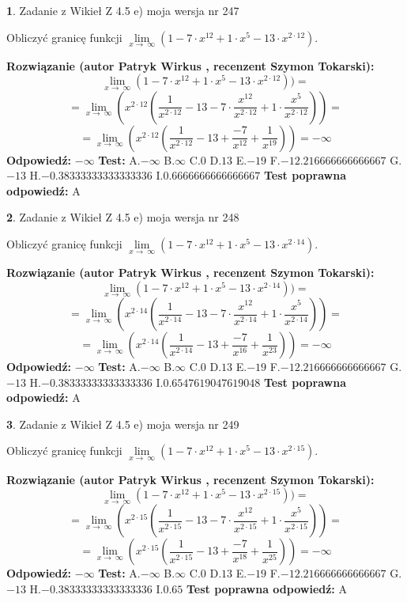 \documentclass[12pt, a4paper]{article}
\theoremstyle{definition} %
\newtheorem{zad}{}
\newcommand{\zadStart}[1]{\begin{zad}#1\newline}
\newcommand{\zadStop}{\end{zad}}
\newcommand{\rozwStart}[2]{\noindent \textbf{Rozwiązanie (autor #1 , recenzent #2): }\newline}
\newcommand{\rozwStop}{\newline}
\newcommand{\odpStart}{\noindent \textbf{Odpowiedź:}\newline}
\newcommand{\odpStop}{\newline}
\newcommand{\testStart}{\noindent \textbf{Test:}\newline}
\newcommand{\testStop}{\newline}
\newcommand{\kluczStart}{\noindent \textbf{Test poprawna odpowiedź:}\newline}
\newcommand{\kluczStop}{\newline}
\begin{document}
\zadStart{Zadanie z Wikieł Z 4.5 e) moja wersja nr 247}


Obliczyć granicę funkcji  $\lim\limits_{x\to\ \infty}(1 - 7 \cdot x^{12}+1 \cdot x^{5}- 13 \cdot x^{2\cdot12})$.
\zadStop
\rozwStart{Patryk Wirkus}{Szymon Tokarski}
$$\lim\limits_{x\to\ \infty}(1 - 7 \cdot x^{12}+1 \cdot x^{5}- 13 \cdot x^{2\cdot12}))=$$
$$=\lim\limits_{x\to\ \infty}(x^{2\cdot12}(\frac{1}{x^{2\cdot12}}-13 -7 \cdot \frac{x^{12}}{x^{2\cdot12}}+1 \cdot \frac{x^{5}}{x^{2\cdot12}}))=$$
$$=\lim\limits_{x\to\ \infty}(x^{2\cdot12}(\frac{1}{x^{2\cdot12}}-13 + \frac{-7}{x^{12}}+ \frac{1}{x^{19}}))=-\infty$$
\rozwStop
\odpStart
$-\infty$
\odpStop
\testStart
A.$-\infty$ B.$\infty$ C.$0$ D.$13$ E.$-19$
F.$-12.216666666666667$ G.$-13$
H.$-0.38333333333333336$
I.$0.6666666666666667$
\testStop
\kluczStart
A
\kluczStop



\zadStart{Zadanie z Wikieł Z 4.5 e) moja wersja nr 248}


Obliczyć granicę funkcji  $\lim\limits_{x\to\ \infty}(1 - 7 \cdot x^{12}+1 \cdot x^{5}- 13 \cdot x^{2\cdot14})$.
\zadStop
\rozwStart{Patryk Wirkus}{Szymon Tokarski}
$$\lim\limits_{x\to\ \infty}(1 - 7 \cdot x^{12}+1 \cdot x^{5}- 13 \cdot x^{2\cdot14}))=$$
$$=\lim\limits_{x\to\ \infty}(x^{2\cdot14}(\frac{1}{x^{2\cdot14}}-13 -7 \cdot \frac{x^{12}}{x^{2\cdot14}}+1 \cdot \frac{x^{5}}{x^{2\cdot14}}))=$$
$$=\lim\limits_{x\to\ \infty}(x^{2\cdot14}(\frac{1}{x^{2\cdot14}}-13 + \frac{-7}{x^{16}}+ \frac{1}{x^{23}}))=-\infty$$
\rozwStop
\odpStart
$-\infty$
\odpStop
\testStart
A.$-\infty$ B.$\infty$ C.$0$ D.$13$ E.$-19$
F.$-12.216666666666667$ G.$-13$
H.$-0.38333333333333336$
I.$0.6547619047619048$
\testStop
\kluczStart
A
\kluczStop



\zadStart{Zadanie z Wikieł Z 4.5 e) moja wersja nr 249}


Obliczyć granicę funkcji  $\lim\limits_{x\to\ \infty}(1 - 7 \cdot x^{12}+1 \cdot x^{5}- 13 \cdot x^{2\cdot15})$.
\zadStop
\rozwStart{Patryk Wirkus}{Szymon Tokarski}
$$\lim\limits_{x\to\ \infty}(1 - 7 \cdot x^{12}+1 \cdot x^{5}- 13 \cdot x^{2\cdot15}))=$$
$$=\lim\limits_{x\to\ \infty}(x^{2\cdot15}(\frac{1}{x^{2\cdot15}}-13 -7 \cdot \frac{x^{12}}{x^{2\cdot15}}+1 \cdot \frac{x^{5}}{x^{2\cdot15}}))=$$
$$=\lim\limits_{x\to\ \infty}(x^{2\cdot15}(\frac{1}{x^{2\cdot15}}-13 + \frac{-7}{x^{18}}+ \frac{1}{x^{25}}))=-\infty$$
\rozwStop
\odpStart
$-\infty$
\odpStop
\testStart
A.$-\infty$ B.$\infty$ C.$0$ D.$13$ E.$-19$
F.$-12.216666666666667$ G.$-13$
H.$-0.38333333333333336$
I.$0.65$
\testStop
\kluczStart
A
\kluczStop
\end{document}
